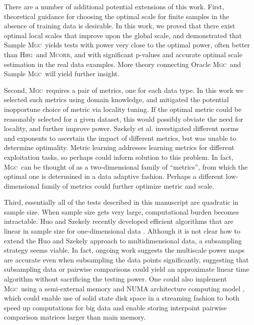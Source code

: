 \documentclass[11pt]{article}
\providecommand{\sct}[1]{{\normalfont\textsc{#1}}}
\newcommand{\Mgc}{\sct{Mgc}}
\newcommand{\Hhg}{\sct{Hhg}}
\newcommand{\Mcorr}{\sct{Mcorr}}
\begin{document}
There are a number of additional potential extensions of this work. First, theoretical guidance for choosing the optimal scale for finite samples in the absence of training data is desirable. 
In this work, we proved that there exist optimal local scales that improve upon the global scale, and demonstrated that Sample \Mgc~yields tests with power very close to the optimal power, often better than \Hhg~and \Mcorr, and with significant p-values and accurate optimal scale estimation in the real data examples. More theory connecting Oracle \Mgc~and  Sample \Mgc~will yield further insight.

Second, \Mgc~requires a pair of metrics, one for each data type. In this work we selected such metrics using domain knowledge, and mitigated the potential inopportune choice of metric via locality tuning.  If the optimal metric could be reasonably selected for a given dataset, this would possibly obviate the need for locality, and further improve power. Szekely et al. investigated different norms and exponents to ascertain the impact of different metrics, but was unable to determine optimality.
Metric learning \cite{xing2003distance} addresses learning metrics for different exploitation tasks, so perhaps could inform solution to this problem.
In fact, \Mgc~can be thought of as a two-dimensional family of ``metrics'', from which the optimal one is determined in a data adaptive fashion.  Perhaps a different low-dimensional family of metrics could further optimize metric and scale.

Third, essentially all of the tests described in this manuscript are quadratic in sample size.  When sample size gets very large, computational burden becomes intractable. Huo and Szekely  recently developed efficient algorithms that are linear in sample size for one-dimensional data \cite{Huo2016}.  Although it is not clear how to extend the Huo and Szekely approach to multidimensional data, a subsampling strategy seems viable. In fact, ongoing work suggests the multiscale power maps are accurate even when subsampling the data points significantly, suggesting that subsampling data or pairwise comparisons could yield an approximate linear time algorithm without sacrificing the testing power.  One could also implement \Mgc~using a semi-external memory and NUMA architecture computing model \cite{Zheng2016},  which could enable use of solid state disk space in a streaming fashion to both speed up computations for big data and enable storing interpoint pairwise comparison matrices larger than main memory.
\end{document}
